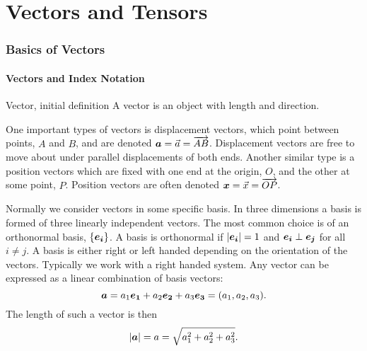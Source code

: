 \part{Vectors and Tensors}
\section{Basics of Vectors}
\subsection{Vectors and Index Notation}
\begin{definition}{Vector, initial definition}{}
    A vector is an object with length and direction.
\end{definition}
One important types of vectors is displacement vectors, which point between points, \(A\) and \(B\), and are denoted \(\bm{a} = \vec{a} = \overrightarrow{AB}\).
Displacement vectors are free to move about under parallel displacements of both ends.
Another similar type is a position vectors which are fixed with one end at the origin, \(O\), and the other at some point, \(P\).
Position vectors are often denoted \(\bm{x} = \vec{x} = \overrightarrow{OP}\).

Normally we consider vectors in some specific basis.
In three dimensions a basis is formed of three linearly independent vectors.
The most common choice is of an orthonormal basis, \(\{\bm{e_{i}}\}\).
A basis is orthonormal if \(\abs{\bm{e_{i}}} = 1\) and \(\bm{e_{i}}\perp\bm{e_{j}}\) for all \(i\ne j\).
A basis is either right or left handed depending on the orientation of the vectors.
Typically we work with a right handed system.
Any vector can be expressed as a linear combination of basis vectors:
\[\bm{a} = a_1\bm{e_{1}} + a_2\bm{e_{2}} + a_3\bm{e_{3}} = (a_1, a_2, a_3).\]
The length of such a vector is then
\[\abs{\bm{a}} = a = \sqrt{a_1^2 + a_2^2 + a_3^2}.\]

